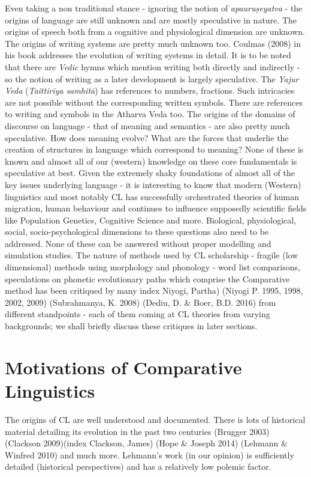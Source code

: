 Even taking a non traditional stance - ignoring the notion of \textit{apauruṣeyatva} - the origins of language are still unknown and are mostly speculative in nature. The origins of speech both from a cognitive and physiological dimension are unknown. The origins of writing systems are pretty much unknown too. Coulmas (2008) in his book addresses the evolution of writing systems in detail. It is to be noted that there are \textit{Vedic} hymns which mention writing both directly and indirectly - so the notion of writing as a later development is largely speculative. The \textit{Yajur Veda} (\textit{Taittirīya samhitā}) has references to numbers, fractions. Such intricacies are not possible without the corresponding written symbols. There are references to writing and symbols in the Atharva Veda too. The origins of the domains of discourse on language - that of meaning and semantics - are also pretty much speculative. How does meaning evolve? What are the forces that underlie the creation of structures in language which correspond to meaning? None of these is known and almost all of our (western) knowledge on these core fundamentals is speculative at best. Given the extremely shaky foundations of almost all of the key issues underlying language - it is interesting to know that modern (Western) linguistics and most notably CL has successfully orchestrated theories of human migration, human behaviour and continues to influence supposedly scientific fields like Population Genetics, Cognitive Science and more. Biological, physiological, social, socio-psychological dimensions to these questions also need to be addressed. None of these can be answered without proper modelling and simulation studies. The nature of methods used by CL scholarship - fragile (low dimensional) methods using morphology and phonology - word list comparisons, speculations on phonetic evolutionary paths which comprise the Comparative method has been critiqued by many index Niyogi, Partha) (Niyogi P. 1995, 1998, 2002, 2009) (Subrahmanya, K. 2008) (Dediu, D. \& Boer, B.D. 2016) from different standpoints - each of them coming at CL theories from varying backgrounds; we shall briefly discuss these critiques in later sections.


\section*{Motivations of Comparative Linguistics}

The origins of CL are well understood and documented. There is lots of historical material detailing its evolution in the past two centuries (Brugger 2003) (Clackson 2009)(index Clackson, James) (Hope \& Joseph 2014) (Lehmann \& Winfred 2010) and much more. Lehmann’s work (in our opinion) is sufficiently detailed (historical perspectives) and has a relatively low polemic factor.

